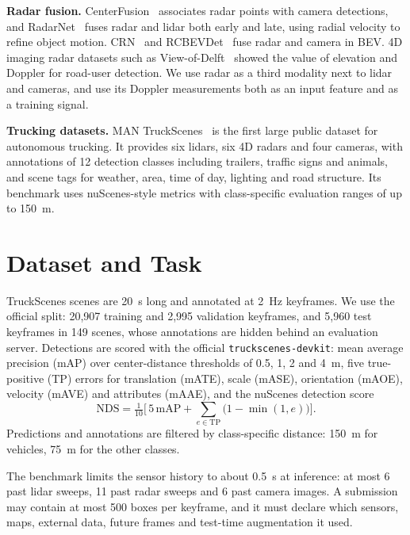 \documentclass[conference]{IEEEtran}
\begin{document}
\textbf{Radar fusion.} CenterFusion~\cite{nabati2021centerfusion} associates radar points with camera detections,
and RadarNet~\cite{yang2020radarnet} fuses radar and lidar both early and late, using radial velocity to refine
object motion. CRN~\cite{kim2023crn} and RCBEVDet~\cite{lin2024rcbevdet} fuse radar and camera in BEV. 4D imaging
radar datasets such as View-of-Delft~\cite{palffy2022vod} showed the value of elevation and Doppler for road-user
detection. We use radar as a third modality next to lidar and cameras, and use its Doppler measurements both as an
input feature and as a training signal.

\textbf{Trucking datasets.} MAN TruckScenes~\cite{fent2024truckscenes} is the first large public dataset for
autonomous trucking. It provides six lidars, six 4D radars and four cameras, with annotations of 12 detection classes
including trailers, traffic signs and animals, and scene tags for weather, area, time of day, lighting and road
structure. Its benchmark uses nuScenes-style metrics with class-specific evaluation ranges of up to 150~m.

\section{Dataset and Task}

TruckScenes scenes are 20~s long and annotated at 2~Hz keyframes. We use the official split: 20{,}907 training and
2{,}995 validation keyframes, and 5{,}960 test keyframes in 149 scenes, whose annotations are hidden behind an
evaluation server. Detections are scored with the official \texttt{truckscenes-devkit}: mean average precision (mAP)
over center-distance thresholds of 0.5, 1, 2 and 4~m, five true-positive (TP) errors for translation (mATE), scale
(mASE), orientation (mAOE), velocity (mAVE) and attributes (mAAE), and the nuScenes detection score
\begin{equation}
\mathrm{NDS} = \tfrac{1}{10}\Big[\,5\,\mathrm{mAP} + \textstyle\sum_{e \in \mathrm{TP}} \big(1 - \min(1, e)\big)\Big].
\end{equation}
Predictions and annotations are filtered by class-specific distance: 150~m for vehicles, 75~m for the other classes.

The benchmark limits the sensor history to about 0.5~s at inference: at most 6 past lidar sweeps, 11 past radar
sweeps and 6 past camera images. A submission may contain at most 500 boxes per keyframe, and it must declare which
sensors, maps, external data, future frames and test-time augmentation it used.
\end{document}

